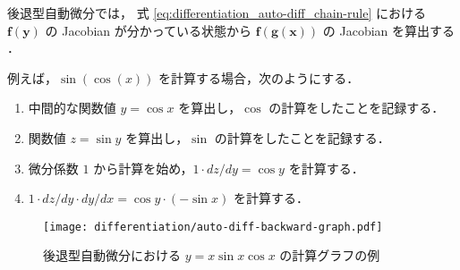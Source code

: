 後退型自動微分では，
式 \eqref{eq:differentiation_auto-diff_chain-rule} における
$\bm{f}(\bm{y})$ の Jacobian が分かっている状態から
$\bm{f}(\bm{g}(\bm{x}))$ の Jacobian を算出する
\cite{Kubota1998}．

例えば，$\sin(\cos(x))$ を計算する場合，次のようにする．

\begin{enumerate}
    \item 中間的な関数値 $y = \cos{x}$ を算出し，$\cos$ の計算をしたことを記録する．
    \item 関数値 $z = \sin{y}$ を算出し，$\sin$ の計算をしたことを記録する．
    \item 微分係数 $1$ から計算を始め，$1 \cdot dz/dy = \cos{y}$ を計算する．
    \item $1 \cdot dz/dy \cdot dy/dx = \cos{y} \cdot (-\sin{x})$ を計算する．
\end{enumerate}

\begin{figure}[tp]
    \centering
    \texttt{[image: differentiation/auto-diff-backward-graph.pdf]}
    \caption{後退型自動微分における $y = x \sin{x} \cos{x}$ の計算グラフの例}
    \label{fig:differentiation_auto-diff_backward-nodes-example}
\end{figure}

